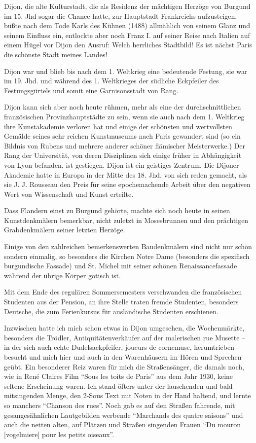 Dijon, die alte Kulturstadt, die als Residenz der mächtigen Herzöge von Burgund im 15. Jhd sogar die Chance hatte, zur Hauptstadt Frankreichs aufzusteigen, büßte nach dem Tode Karls des Kühnen (1488) allmählich von seinem Glanz und seinem Einfluss ein, entlockte aber noch Franz I. auf seiner Reise nach Italien auf einem Hügel vor Dijon den Ausruf: Welch herrliches Stadtbild! Es ist nächst Paris die schönste Stadt meines Landes!

Dijon war und blieb bis nach dem 1. Weltkrieg eine bedeutende Festung, sie war im 19. Jhd. und während des 1. Weltkrieges der südliche Eckpfeiler des Festungsgürtels und somit eine Garnisonsstadt von Rang.

Dijon kann sich aber noch heute rühmen, mehr als eine der durchschnittlichen französischen Provinzhauptstädte zu sein, wenn sie auch nach dem 1. Weltkrieg ihre Kunstakademie verloren hat und einige der schönsten und wertvollsten Gemälde seines sehr reichen Kunstmuseums nach Paris gewandert sind (so ein Bildnis von Rubens und mehrere anderer schöner flämischer Meisterwerke.) Der Rang der Universität, von deren Disziplinen sich einige früher in Abhängigkeit von Lyon befanden, ist gestiegen. Dijon ist ein geistiges Zentrum. Die Dijoner Akademie hatte in Europa in der Mitte des 18. Jhd. von sich reden gemacht, als sie J. J. Rousseau den Preis für seine epochemachende Arbeit über den negativen Wert von Wissenschaft und Kunst erteilte.

Dass Flandern einst zu Burgund gehörte, machte sich noch heute in seinen Kunstdenkmälern bemerkbar, nicht zuletzt in Mosesbrunnen und den prächtigen Grabdenkmälern seiner letzten Herzöge.

Einige von den zahlreichen bemerkenswerten Baudenkmälern sind nicht nur schön sondern einmalig, so besonders die Kirchen Notre Dame (besonders die spezifisch burgundische Fassade) und St. Michel mit seiner schönen Renaissancefassade während der übrige Körper gotisch ist.

Mit dem Ende des regulären Sommersemesters verschwanden die französischen Studenten aus der Pension, an ihre Stelle traten fremde Studenten, besonders Deutsche, die zum Ferienkursus für ausländische Studenten erschienen.

Inzwischen hatte ich mich schon etwas in Dijon umgesehen, die Wochenmärkte, besonders die Trödler, Antiquitätenverkäufer auf der malerischen rue Musette -- in der sich auch echte Dudelsackpfeifer, joueurs de cornemuse, herumtrieben -- besucht und mich hier und auch in den Warenhäusern im Hören und Sprechen geübt. Ein besonderer Reiz waren für mich die Straßensänger, die damals noch, wie in René Claires Film \enquote{Sous les toits de Paris} aus dem Jahr 1930, keine seltene Erscheinung waren. Ich stand öfters unter der lauschenden und bald mitsingenden Menge, den 2-Sous Text mit Noten in der Hand haltend, und lernte so manchers \enquote{Chanson des rues}. Noch gab es auf den Straßen fahrende, mit gesangesähnlichen Lautgebilden werbende \enquote{Marchands des quatre saisons} und auch die netten alten, auf Plätzen und Straßen singenden Frauen \enquote{Du mouron [vogelmiere] pour les petits oiseaux}.

